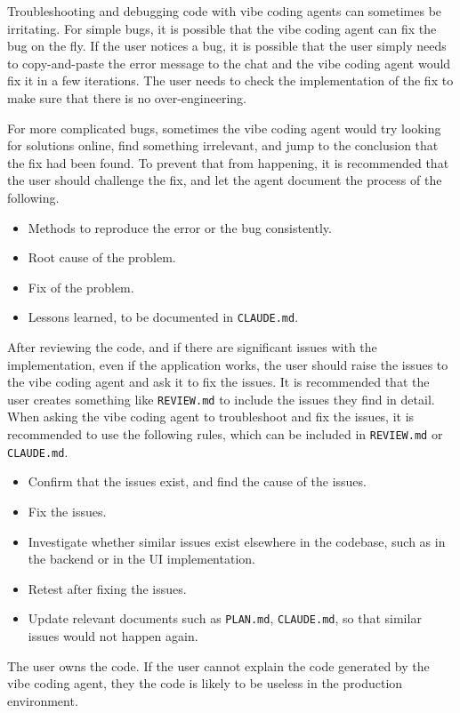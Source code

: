 Troubleshooting and debugging code with vibe coding agents can sometimes be irritating. For simple bugs, it is possible that the vibe coding agent can fix the bug on the fly. If the user notices a bug, it is possible that the user simply needs to copy-and-paste the error message to the chat and the vibe coding agent would fix it in a few iterations. The user needs to check the implementation of the fix to make sure that there is no over-engineering.

For more complicated bugs, sometimes the vibe coding agent would try looking for solutions online, find something irrelevant, and jump to the conclusion that the fix had been found. To prevent that from happening, it is recommended that the user should challenge the fix, and let the agent document the process of the following.
\begin{itemize}
  \item Methods to reproduce the error or the bug consistently.
  \item Root cause of the problem.
  \item Fix of the problem.
  \item Lessons learned, to be documented in \verb|CLAUDE.md|.
\end{itemize}

After reviewing the code, and if there are significant issues with the implementation, even if the application works, the user should raise the issues to the vibe coding agent and ask it to fix the issues. It is recommended that the user creates something like \verb|REVIEW.md| to include the issues they find in detail. When asking the vibe coding agent to troubleshoot and fix the issues, it is recommended to use the following rules, which can be included in \verb|REVIEW.md| or \verb|CLAUDE.md|.
\begin{itemize}
  \item Confirm that the issues exist, and find the cause of the issues.
  \item Fix the issues.
  \item Investigate whether similar issues exist elsewhere in the codebase, such as in the backend or in the UI implementation.
  \item Retest after fixing the issues.
  \item Update relevant documents such as \verb|PLAN.md|, \verb|CLAUDE.md|, so that similar issues would not happen again.
\end{itemize}

The user owns the code. If the user cannot explain the code generated by the vibe coding agent, they the code is likely to be useless in the production environment.

